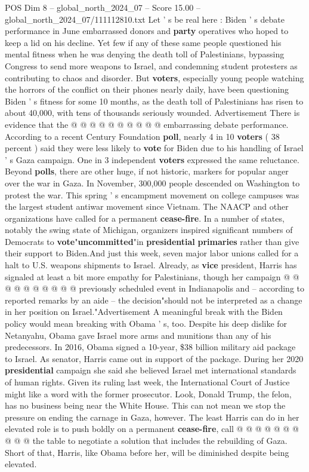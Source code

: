 \begin{textsample}{POS Dim 8 – global\_north\_2024\_07 – Score 15.00 – global\_north\_2024\_07/111112810.txt}
Let ' s be real here : Biden ' s debate performance in June embarrassed donors and \textbf{party} operatives who hoped to keep a lid on his decline.
Yet few if any of these same people questioned his mental fitness when he was denying the death toll of Palestinians, bypassing Congress to send more weapons to Israel, and condemning student protesters as contributing to chaos and disorder.
But \textbf{voters}, especially young people watching the horrors of the conflict on their phones nearly daily, have been questioning Biden ' s fitness for some 10 months, as the death toll of Palestinians has risen to about 40,000, with tens of thousands seriously wounded.
Advertisement There is evidence that the @ @ @ @ @ @ @ @ @ @ embarrassing debate performance.
According to a recent Century Foundation \textbf{poll}, nearly 4 in 10 \textbf{voters} ( 38 percent ) said they were less likely to \textbf{vote} for Biden due to his handling of Israel ' s Gaza campaign.
One in 3 independent \textbf{voters} expressed the same reluctance.
Beyond \textbf{polls}, there are other huge, if not historic, markers for popular anger over the war in Gaza.
In November, 300,000 people descended on Washington to protest the war.
This spring ' s encampment movement on college campuses was the largest student antiwar movement since Vietnam.
The NAACP and other organizations have called for a permanent \textbf{cease-fire}.
In a number of states, notably the swing state of Michigan, organizers inspired significant numbers of Democrats to \textbf{vote}"\textbf{uncommitted}"in \textbf{presidential} \textbf{primaries} rather than give their support to Biden.And just this week, seven major labor unions called for a halt to U.S. weapons shipments to Israel.
Already, as \textbf{vice} president, Harris has signaled at least a bit more empathy for Palestinians, though her campaign @ @ @ @ @ @ @ @ @ @ previously scheduled event in Indianapolis and -- according to reported remarks by an aide -- the decision"should not be interpreted as a change in her position on Israel."Advertisement A meaningful break with the Biden policy would mean breaking with Obama ' s, too.
Despite his deep dislike for Netanyahu, Obama gave Israel more arms and munitions than any of his predecessors.
In 2016, Obama signed a 10-year, \$38 billion military aid package to Israel.
As senator, Harris came out in support of the package.
During her 2020 \textbf{presidential} campaign she said she believed Israel met international standards of human rights.
Given its ruling last week, the International Court of Justice might like a word with the former prosecutor.
Look, Donald Trump, the felon, has no business being near the White House.
This can not mean we stop the pressure on ending the carnage in Gaza, however.
The least Harris can do in her elevated role is to push boldly on a permanent \textbf{cease-fire}, call @ @ @ @ @ @ @ @ @ @ the table to negotiate a solution that includes the rebuilding of Gaza.
Short of that, Harris, like Obama before her, will be diminished despite being elevated.

\end{textsample}
